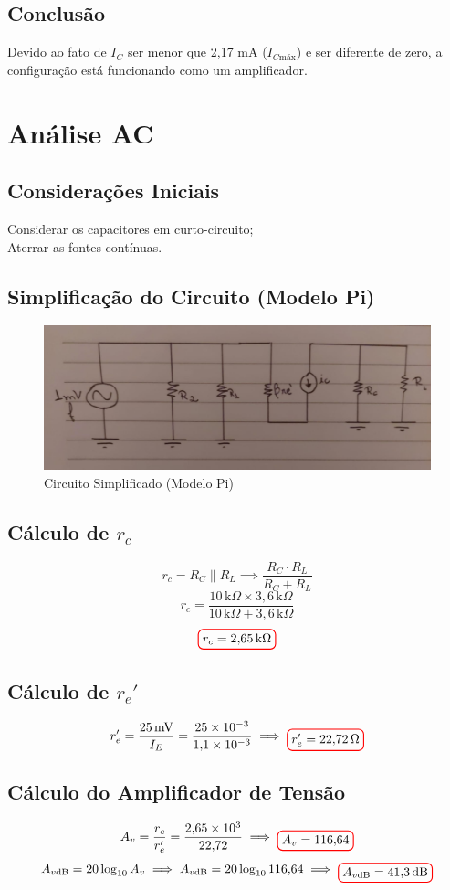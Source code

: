 \documentclass[12pt,openany,oneside,a4paper]{abntex2}
\begin{document}
\section{Conclusão}
Devido ao fato de $I_{C}$ ser menor que 2{,}17 mA ($I_{C\text{máx}}$) e ser diferente de zero, a configuração está funcionando como um amplificador.

\chapter{Análise AC}
\section{Considerações Iniciais}
Considerar os capacitores em curto-circuito; \\
Aterrar as fontes contínuas.

\section{Simplificação do Circuito (Modelo Pi)}
\begin{figure}[h]
  \centering
  \includegraphics[width=\linewidth]{f3.jpeg}
  \caption{Circuito Simplificado (Modelo Pi)}
  \label{fig:exemplo}
\end{figure}

\section{Cálculo de $r_c$}
\[
r_c = {R_C \parallel R_L} \implies \frac{R_C \cdot R_L}{R_C + R_L}
\]
\[
r_c = \frac{10 \, \text{k}\Omega \times 3{,}6 \, \text{k}\Omega}{10 \, \text{k}\Omega + 3{,}6 \, \text{k}\Omega}
\]
\[
\tikz[baseline]{\node[draw=red, thick, rounded corners] {$r_c = 2{,}65 \, \text{k}\Omega$};}
\]

\section{Cálculo de $r_e'$}
\[
r_e^{\prime} = \frac{25 \, \text{mV}}{I_E} = \frac{25 \times 10^{-3}}{1{,}1 \times 10^{-3}} \implies \tikz[baseline]{\node[draw=red, thick, rounded corners] {$r_e^{\prime} = 22{,}72 \, \Omega$};}
\]

\section{Cálculo do Amplificador de Tensão}
\[
A_v = \frac{r_c}{r_e'} = \frac{2{,}65 \times 10^3}{22{,}72} \implies \tikz[baseline]{\node[draw=red, thick, rounded corners] {$A_v = 116{,}64$};}
\]
\[
A_{v\text{dB}} = 20 \log_{10} A_v \implies A_{v\text{dB}} = 20 \log_{10} 116{,}64 \implies \tikz[baseline]{\node[draw=red, thick, rounded corners] {$A_{v\text{dB}} = 41{,}3 \, \text{dB}$};}
\]
\end{document}
